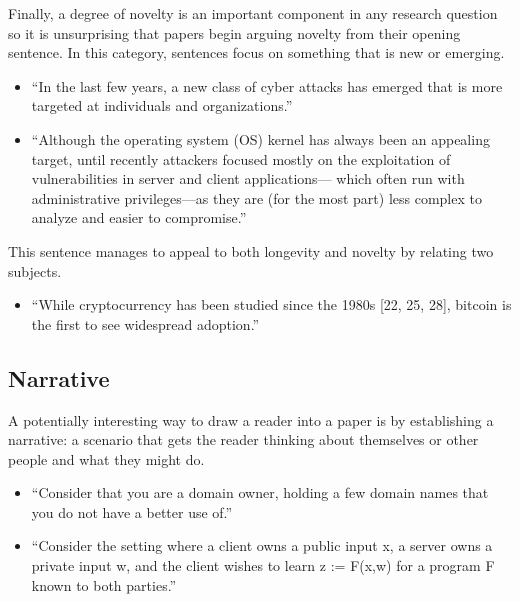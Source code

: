 \documentclass[sigconf,anonymous]{acmart}
\begin{document}
	Finally, a degree of novelty is an important component in any research question so it is unsurprising that papers begin arguing novelty from their opening sentence. In this category, sentences focus on something that is new or emerging. 
	\begin{itemize}
		\item 	``In the last few years, a new class of cyber attacks has emerged that is more targeted at individuals and organizations.''~\cite{le2014look}
		
		\item  ``Although the operating system (OS) kernel has always been an appealing target, until recently attackers focused mostly on the exploitation of vulnerabilities in server and client applications— which often run with administrative privileges—as they are (for the most part) less complex to analyze and easier to compromise.''~\cite{kemerlis2014ret2dir}
	\end{itemize}
	
	This sentence manages to appeal to both longevity and novelty by relating two subjects.
	\begin{itemize}
		
		\item  ``While cryptocurrency has been studied since the 1980s [22, 25, 28], bitcoin is the first to see widespread adoption.''~\cite{heilman2015eclipse}
		
	\end{itemize}
	
	\subsection{Narrative}
	
	A potentially interesting way to draw a reader into a paper is by establishing a narrative: a scenario that gets the reader thinking about themselves or other people and what they might do.  
	\begin{itemize}
		\item 	``Consider that you are a domain owner, holding a few domain names that you do not have a better use of.''~\cite{alrwais2014understanding}
		
		\item 	``Consider the setting where a client owns a public input x, a server owns a private input w, and the client wishes to learn z := F(x,w) for a program F known to both parties.''~\cite{ben2014succinct}
	\end{itemize}
	
\end{document}
